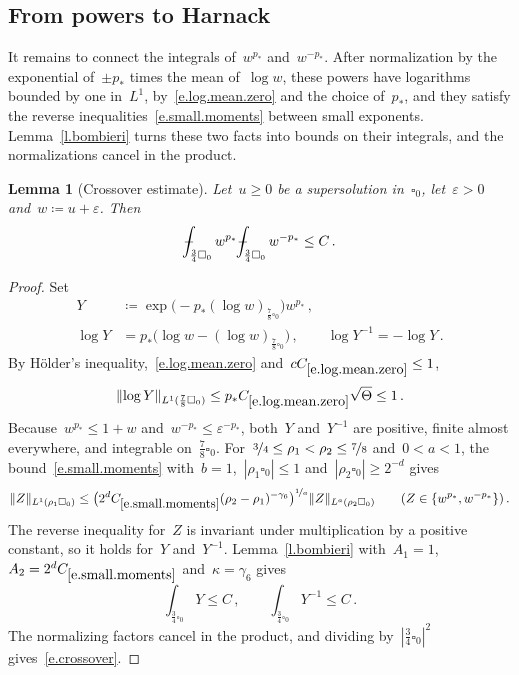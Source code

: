 \documentclass[11pt,letterpaper]{article}
\numberwithin{equation}{section}
\newtheorem{lemma}[theorem]{Lemma}
\theoremstyle{definition}
\newcommand{\eps}{\varepsilon}
\newcommand{\nf}{\nicefrac}
\newcommand{\cu}{\square}
\DeclarePairedDelimiter{\norm}{\lVert}{\rVert}
\def\Xint#1{\mathchoice
	{\XXint\displaystyle\textstyle{#1}}%
	{\XXint\textstyle\scriptstyle{#1}}%
	{\XXint\scriptstyle\scriptscriptstyle{#1}}%
	{\XXint\scriptscriptstyle\scriptscriptstyle{#1}}%
	\!\int}
\def\XXint#1#2#3{{\setbox0=\hbox{$#1{#2#3}{\int}$}
		\vcenter{\hbox{$#2#3$}}\kern-.5\wd0}}
\def\fint{\Xint-}
\begin{document}
\subsection{From powers to Harnack}

It remains to connect the integrals of~$w^{p_*}$ and~$w^{-p_*}$. After normalization by the exponential of~$\pm p_*$ times the mean of~$\log w$, these powers have logarithms bounded by one in~$L^1$, by~\eqref{e.log.mean.zero} and the choice of~$p_*$, and they satisfy the reverse inequalities~\eqref{e.small.moments} between small exponents. Lemma~\ref{l.bombieri} turns these two facts into bounds on their integrals, and the normalizations cancel in the product.

\begin{lemma}[Crossover estimate]
\label{l.crossover}
Let~$u\geq0$ be a supersolution in~$\cu_0$, let~$\eps>0$ and~$w\coloneqq u+\eps$. Then
\begin{equation}
	\fint_{\frac34\cu_0}w^{p_*}\fint_{\frac34\cu_0}w^{-p_*}\leq C\,.
	\label{e.crossover}
\end{equation}
\end{lemma}

\begin{proof}
Set
\begin{align*}
	Y&\coloneqq\exp\bigl(-p_*(\log w)_{\frac78\cu_0}\bigr)w^{p_*}\,,\\
	\log Y&=p_*\bigl(\log w-(\log w)_{\frac78\cu_0}\bigr)\,,\qquad\log Y^{-1}=-\log Y\,.
\end{align*}
By H\"older's inequality,~\eqref{e.log.mean.zero} and~$cC_{\eqref{e.log.mean.zero}}\leq1$,
\begin{equation*}
	\norm{\log Y}_{L^1(\frac78\cu_0)}\leq p_*C_{\eqref{e.log.mean.zero}}\sqrt\Theta\leq1\,.
\end{equation*}
Because~$w^{p_*}\leq1+w$ and~$w^{-p_*}\leq\eps^{-p_*}$, both~$Y$ and~$Y^{-1}$ are positive, finite almost everywhere, and integrable on~$\frac78\cu_0$. For~$\nf34\leq\rho_1<\rho_2\leq\nf78$ and~$0<a<1$, the bound~\eqref{e.small.moments} with~$b=1$,~$|\rho_1\cu_0|\leq1$ and~$|\rho_2\cu_0|\geq2^{-d}$ gives
\begin{equation*}
	\norm{Z}_{L^1(\rho_1\cu_0)}\leq\bigl(2^dC_{\eqref{e.small.moments}}(\rho_2-\rho_1)^{-\gamma_6}\bigr)^{\nf1a}\norm{Z}_{L^a(\rho_2\cu_0)}\qquad(Z\in\{w^{p_*},w^{-p_*}\})\,.
\end{equation*}
The reverse inequality for~$Z$ is invariant under multiplication by a positive constant, so it holds for~$Y$ and~$Y^{-1}$. Lemma~\ref{l.bombieri} with~$A_1=1$,~$A_2=2^dC_{\eqref{e.small.moments}}$ and~$\kappa=\gamma_6$ gives
\begin{equation*}
	\int_{\frac34\cu_0}Y\leq C\,,\qquad\int_{\frac34\cu_0}Y^{-1}\leq C\,.
\end{equation*}
The normalizing factors cancel in the product, and dividing by~$|\frac34\cu_0|^2$ gives~\eqref{e.crossover}.
\end{proof}
\end{document}
